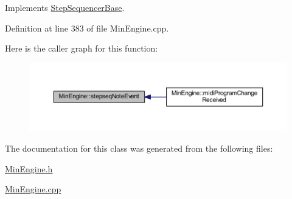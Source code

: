 Implements \hyperlink{class_step_sequencer_base_a9f32f8ae8eb8afb1c2ea39ed8d856657}{Step\+Sequencer\+Base}.



Definition at line 383 of file Min\+Engine.\+cpp.

Here is the caller graph for this function\+:
\nopagebreak
\begin{figure}[H]
\begin{center}
\leavevmode
\includegraphics[width=350pt]{class_min_engine_a46ab2a887b8c83c9b484304778bc01a1_icgraph}
\end{center}
\end{figure}


The documentation for this class was generated from the following files\+:\begin{DoxyCompactItemize}
\item 
\hyperlink{_min_engine_8h}{Min\+Engine.\+h}\item 
\hyperlink{_min_engine_8cpp}{Min\+Engine.\+cpp}\end{DoxyCompactItemize}
